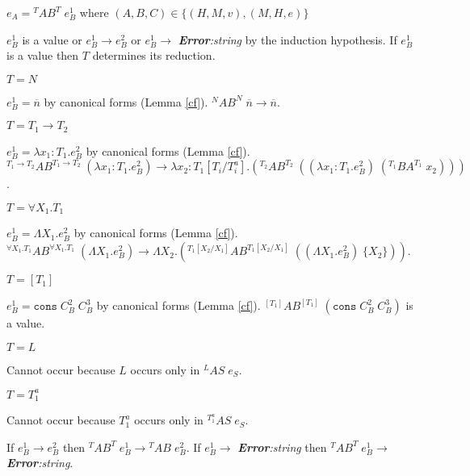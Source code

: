 \begin{case}
$e_{A}={^{T}A}B^{T}\;e_{B}^{1}$ where $(A,B,C)\in\lbrace(H,M,v),(M,H,e)\rbrace$

$e_{B}^{1}$ is a value or $e_{B}^{1}\rightarrow e_{B}^{2}$ or $e_{B}^{1}\rightarrow$ \emph{\textbf{Error}:\;string} by the induction hypothesis.  If $e_{B}^{1}$ is a value then $T$ determines its reduction.
\begin{subcase}
$T=N$

$e_{B}^{1}=\overline{n}$ by canonical forms (Lemma \ref{cf}).  $^{N}AB^{N}\;\overline{n}\rightarrow\overline{n}$.
\end{subcase}
\begin{subcase}
$T=T_{1}\rightarrow T_{2}$

$e_{B}^{1}=\lambda x_{1}:T_{1}.e_{B}^{2}$ by canonical forms (Lemma \ref{cf}).  $^{T_{1}\rightarrow T_{2}}AB^{T_{1}\rightarrow T_{2}}\;(\lambda x_{1}:T_{1}.e_{B}^{2})\rightarrow\lambda x_{2}:T_{1}[T_{i}/T^{a}_{i}].(^{T_{2}}AB^{T_{2}}\;((\lambda x_{1}:T_{1}.e_{B}^{2})\;(^{T_{1}}BA^{T_{1}}\;x_{2})))$.
\end{subcase}
\begin{subcase}
$T=\forall X_{1}.T_{1}$

$e_{B}^{1}=\Lambda X_{1}.e_{B}^{2}$ by canonical forms (Lemma \ref{cf}).  $^{\forall X_{1}.T_{1}}AB^{\forall X_{1}.T_{1}}\;(\Lambda X_{1}.e_{B}^{2})\rightarrow\Lambda X_{2}.(^{T_{1}[X_{2}/X_{1}]}AB^{T_{1}[X_{2}/X_{1}]}\;((\Lambda X_{1}.e_{B}^{2})\;\lbrace X_{2}\rbrace))$.
\end{subcase}
\begin{subcase}
$T=[T_{1}]$

$e_{B}^{1}=\mathtt{cons}\;C_{B}^{2}\;C_{B}^{3}$ by canonical forms (Lemma \ref{cf}).  $^{[T_{1}]}AB^{[T_{1}]}\;(\mathtt{cons}\;C_{B}^{2}\;C_{B}^{3})$ is a value.
\end{subcase}
\begin{subcase}
$T=L$

Cannot occur because $L$ occurs only in $^{L}AS\;e_{S}$.
\end{subcase}
\begin{subcase}
$T=T_{1}^{a}$

Cannot occur because $T_{1}^{a}$ occurs only in $^{T_{1}^{a}}AS\;e_{S}$.
\end{subcase}
If $e_{B}^{1}\rightarrow e_{B}^{2}$ then $^{T}AB^{T}\;e_{B}^{1}\rightarrow{^{T}A}B\;e_{B}^{2}$.  If $e_{B}^{1}\rightarrow$ \emph{\textbf{Error}:\;string} then $^{T}AB^{T}\;e_{B}^{1}\rightarrow$ \emph{\textbf{Error}:\;string}.
\end{case}